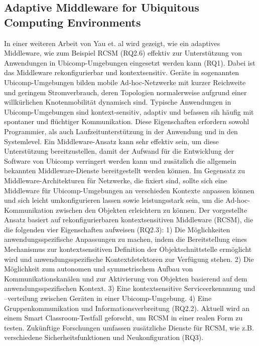\documentclass[conference,compsoc]{IEEEtran}
\begin{document}
\subsection{Adaptive Middleware for Ubiquitous Computing Environments}
In einer weiteren Arbeit von Yau et. al \cite{yau2002adaptive} wird gezeigt, wie ein adaptives Middleware, wie zum Beispiel RCSM (RQ2.6) effektiv zur Unterstützung von Anwendungen in Ubicomp-Umgebungen eingesetzt werden kann (RQ1). Dabei ist das Middleware rekonfigurierbar und kontextsensitiv. Geräte in sogenannten Ubicomp-Umgebungen bilden mobile Ad-hoc-Netzwerke mit kurzer Reichweite und geringem Stromverbrauch, deren Topologien normalerweise aufgrund einer willkürlichen Knotenmobilität dynamisch sind. Typische Anwendungen in Ubicomp-Umgebungen sind kontext-sensitiv, adaptiv und befassen sih häufig mit spontaner und flüchtiger Kommunikation. Diese Eigenschaften erfordern sowohl Programmier, als auch Laufzeitunterstützung in der Anwendung und in den Systemlevel. Ein Middleware-Ansatz kann sehr effektiv sein, um diese Unterstützung bereitzustellen, damit der Aufwand für die Entwicklung der Software von Ubicomp verringert werden kann und zusätzlich die allgemein bekannten Middleware-Dienste bereitgestellt werden können. Im Gegensatz zu Middleware-Architekturen für Netzwerke, die fixiert sind, sollte sich eine Middleware für Ubicomp-Umgebungen an verschieden Kontexte anpassen können und sich leicht umkonfigurieren lassen sowie leistungsstark sein, um die Ad-hoc-Kommunikation zwischen den Objekten erleichtern zu können. Der vorgestellte Ansatz basiert auf rekonfigurierbaren kontextsensitiven Middleware (RCSM), die die folgenden vier Eigenschaften aufweisen (RQ2.3):  1) Die Möglichkeiten anwendungsspezifische Anpassungen zu machen, indem die Bereitstellung eines Mechanismus zur kontextsensitiven Definition der Objektschnittstelle ermöglicht wird und anwendungsspezifische Kontextdetektoren zur Verfügung stehen. 2) Die Möglichkeit zum autonomen und symmetrischem Aufbau von Kommunikationskanälen und zur Aktivierung von Objekten basierend auf dem anwendungsspezifischen Kontext. 3) Eine kontextsensitive Serviceerkennnung und –verteilung zwischen Geräten in einer Ubicomp-Umgebung. 4) Eine Gruppenkommunikation und Informationsverbreitung (RQ2.2). Aktuell wird an einem Smart Classroom-Testfall geforscht, um RCSM in einer realen Form zu testen. Zukünftige Forschungen umfassen zusätzliche Dienste für RCSM, wie z.B. verschiedene Sicherheitsfunktionen und Neukonfiguration (RQ3). 

\end{document}
